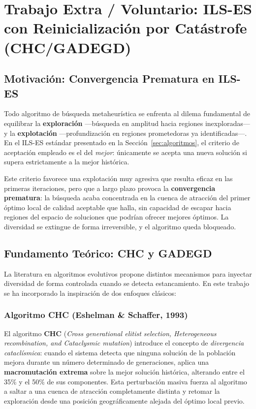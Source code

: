 \newpage
\section{Trabajo Extra / Voluntario: ILS-ES con Reinicialización por Catástrofe (CHC/GADEGD)}
\label{sec:extra}

\subsection{Motivación: Convergencia Prematura en ILS-ES}

Todo algoritmo de búsqueda metaheurística se enfrenta al dilema fundamental de equilibrar la
\textbf{exploración} —búsqueda en amplitud hacia regiones inexploradas— y la \textbf{explotación}
—profundización en regiones prometedoras ya identificadas—. En el ILS-ES estándar presentado en la
Sección~\ref{sec:algoritmos}, el criterio de aceptación empleado es el del \emph{mejor}: únicamente se
acepta una nueva solución si supera estrictamente a la mejor histórica.

Este criterio favorece una explotación muy agresiva que resulta eficaz en las primeras iteraciones,
pero que a largo plazo provoca la \textbf{convergencia prematura}: la búsqueda acaba concentrada en
la cuenca de atracción del primer óptimo local de calidad aceptable que halla, sin capacidad de
escapar hacia regiones del espacio de soluciones que podrían ofrecer mejores óptimos. La diversidad
se extingue de forma irreversible, y el algoritmo queda bloqueado.

\subsection{Fundamento Teórico: CHC y GADEGD}

La literatura en algoritmos evolutivos propone distintos mecanismos para inyectar diversidad de
forma controlada cuando se detecta estancamiento. En este trabajo se ha incorporado la inspiración
de dos enfoques clásicos:

\subsubsection{Algoritmo CHC (Eshelman \& Schaffer, 1993)}

El algoritmo \textbf{CHC} (\textit{Cross generational elitist selection, Heterogeneous recombination,
and Cataclysmic mutation}) introduce el concepto de \emph{divergencia cataclísmica}: cuando el
sistema detecta que ninguna solución de la población mejora durante un número determinado de
generaciones, aplica una \textbf{macromutación extrema} sobre la mejor solución histórica, alterando
entre el 35\% y el 50\% de sus componentes. Esta perturbación masiva fuerza al algoritmo a saltar a
una cuenca de atracción completamente distinta y retomar la exploración desde una posición
geográficamente alejada del óptimo local previo.

